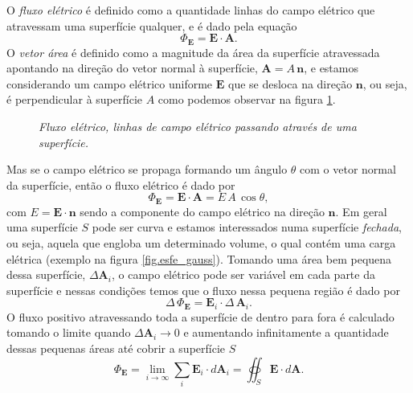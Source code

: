 O \textit{fluxo elétrico} é definido como a quantidade linhas do campo elétrico que atravessam uma superfície qualquer, e é dado pela equação
\begin{equation*}
\Phi_\textbf{E}=\textbf{E}\cdot\textbf{A}. 
\end{equation*} 
O \textit{vetor área} é definido como a magnitude da área da superfície atravessada apontando na direção do vetor normal à superfície, $\textbf{A}=A\,\textbf{n}$, e estamos considerando um campo elétrico uniforme $\textbf{E}$ que se desloca na direção $\textbf{n}$, ou seja, é perpendicular à superfície $A$ como podemos observar na figura \ref{fig.flux_ele}.
\begin{figure}[!htb]
\centering
{}
\quad
{}
\caption{\textit{Fluxo elétrico, linhas de campo elétrico passando através de uma superfície.}}
\label{fig.flux_ele}
\end{figure}
Mas se o campo elétrico se propaga formando um ângulo $\theta$ com o vetor normal da superfície, então o fluxo elétrico é dado por
\begin{equation*}
\Phi_\textbf{E}=\textbf{E}\cdot\textbf{A}=E\,A\,\cos\theta,
\end{equation*}
com $E=\textbf{E}\cdot\textbf{n}$ sendo a componente do campo elétrico na direção $\textbf{n}$. Em geral uma superfície $S$ pode ser curva e estamos interessados numa superfície \textit{fechada}, ou seja, aquela que engloba um determinado volume, o qual contém uma carga elétrica (exemplo na figura \ref{fig.esfe_gauss}). Tomando uma área bem pequena dessa superfície, $\Delta\textbf{A}_i$, o campo elétrico pode ser variável em cada parte da superfície e nessas condições temos que o fluxo nessa pequena região é dado por
\begin{equation*}
\Delta\,\Phi_\textbf{E}=\textbf{E}_i\cdot\Delta\,\textbf{A}_i.
\end{equation*}
O fluxo positivo atravessando toda a superfície de dentro para fora é calculado tomando o limite quando $\Delta\textbf{A}_i\to 0$ e aumentando infinitamente a quantidade dessas pequenas áreas até cobrir a superfície $S$
\begin{equation}\label{eq.fluxo_eletr}
\Phi_\textbf{E}=\lim_{i\to\infty}\sum_i\textbf{E}_i\cdot\textit{d}\textbf{A}_i=\oiint_S\textbf{E}\cdot\textit{d}\textbf{A}.
\end{equation}

